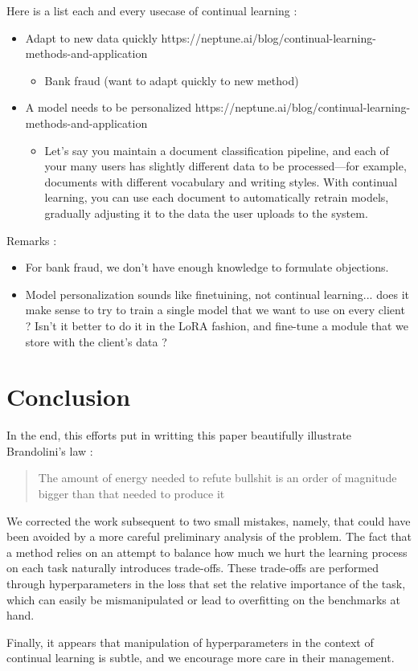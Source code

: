 \documentclass[11pt]{article}
\begin{document}
Here is a list each and every usecase of continual learning :
\begin{itemize}
    \item Adapt to new data quickly https://neptune.ai/blog/continual-learning-methods-and-application
        \begin{itemize}
            \item Bank fraud (want to adapt quickly to new method)
        \end{itemize}
    \item A model needs to be personalized https://neptune.ai/blog/continual-learning-methods-and-application
        \begin{itemize}
            \item Let’s say you maintain a document classification pipeline, and each of your many users has slightly different data to be processed—for example, documents with different vocabulary and writing styles. With continual learning, you can use each document to automatically retrain models, gradually adjusting it to the data the user uploads to the system.
        \end{itemize}
\end{itemize}

Remarks :
\begin{itemize}
    \item For bank fraud, we don't have enough knowledge to formulate objections.
    \item Model personalization sounds like finetuining, not continual learning... does it make sense to try to train a single model that we want to use on every client ? Isn't it better to do it in the LoRA fashion, and fine-tune a module that we store with the  client's data ?
\end{itemize}



\section{Conclusion}



In the end, this efforts put in writting this paper beautifully illustrate Brandolini's law : 
\begin{quote}
    The amount of energy needed to refute bullshit is an order of magnitude bigger than that needed to produce it
\end{quote}
We corrected the work subsequent to two small mistakes, namely, that could have been avoided by a more careful preliminary analysis of the problem. The fact that a method relies on an attempt to balance how much we hurt the learning process on each task naturally introduces trade-offs. These trade-offs are performed through hyperparameters in the loss that set the relative importance of the task, which can easily be mismanipulated or lead to overfitting on the benchmarks at hand.


\vspace{1mm}
\noindent
Finally, it appears that manipulation of hyperparameters in the context of continual learning is subtle, and we encourage more care in their management.



\nocite{*}
\printbibliography
\end{document}
